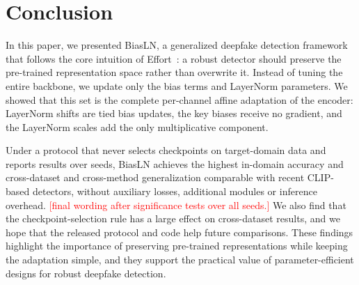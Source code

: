 \documentclass[fonts]{icst}
\newif\ifrevmark\revmarkfalse
\newcommand{\rev}[1]{\ifrevmark{\color{revblue}#1}\else#1\fi}
\newif\ifpending\pendingtrue
\newcommand{\pending}[1]{\ifpending\textcolor{red}{[#1]}\else\errmessage{pending text left: #1}\fi}
\begin{document}
\begin{table}[H]
\centering
\captionsetup{labelsep=period, labelfont=bf, hypcap=false}
\caption{\rev{Measured cost on an NVIDIA A100-40GB (fp32, $224\times224$). Train: batch 32, forward + backward + Adam step. Infer: batch 1. Ckpt: size of the stored trainable tensors.}}
\label{tab:cost}
\end{table}

\section{Conclusion}

In this paper, we presented BiasLN, a generalized deepfake detection framework that follows the core intuition of Effort~\cite{yan2025effort}: a robust detector should preserve the pre-trained representation space \rev{rather than overwrite it}.
Instead of tuning the entire backbone, we update only the bias terms and LayerNorm parameters. \rev{We showed that this set is the complete per-channel affine adaptation of the encoder: LayerNorm shifts are tied bias updates, the key biases receive no gradient, and the LayerNorm scales add the only multiplicative component.}

\rev{Under a protocol that never selects checkpoints on target-domain data and reports results over seeds, BiasLN achieves the highest in-domain accuracy and cross-dataset and cross-method generalization comparable with recent CLIP-based detectors, without auxiliary losses, additional modules or inference overhead.} \pending{final wording after significance tests over all seeds.}
\rev{We also find that the checkpoint-selection rule has a large effect on cross-dataset results, and we hope that the released protocol and code help future comparisons.}
These findings highlight the importance of preserving pre-trained representations while keeping the adaptation simple, and they support the practical value of parameter-efficient designs for robust deepfake detection.
\end{document}
